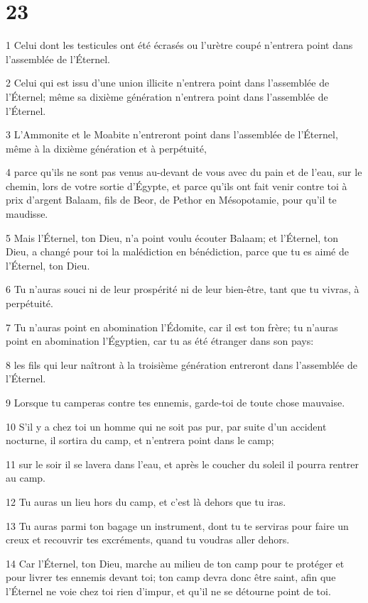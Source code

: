 \chapter{23}

\par 1 Celui dont les testicules ont été écrasés ou l'urètre coupé n'entrera point dans l'assemblée de l'Éternel.
\par 2 Celui qui est issu d'une union illicite n'entrera point dans l'assemblée de l'Éternel; même sa dixième génération n'entrera point dans l'assemblée de l'Éternel.
\par 3 L'Ammonite et le Moabite n'entreront point dans l'assemblée de l'Éternel, même à la dixième génération et à perpétuité,
\par 4 parce qu'ils ne sont pas venus au-devant de vous avec du pain et de l'eau, sur le chemin, lors de votre sortie d'Égypte, et parce qu'ils ont fait venir contre toi à prix d'argent Balaam, fils de Beor, de Pethor en Mésopotamie, pour qu'il te maudisse.
\par 5 Mais l'Éternel, ton Dieu, n'a point voulu écouter Balaam; et l'Éternel, ton Dieu, a changé pour toi la malédiction en bénédiction, parce que tu es aimé de l'Éternel, ton Dieu.
\par 6 Tu n'auras souci ni de leur prospérité ni de leur bien-être, tant que tu vivras, à perpétuité.
\par 7 Tu n'auras point en abomination l'Édomite, car il est ton frère; tu n'auras point en abomination l'Égyptien, car tu as été étranger dans son pays:
\par 8 les fils qui leur naîtront à la troisième génération entreront dans l'assemblée de l'Éternel.
\par 9 Lorsque tu camperas contre tes ennemis, garde-toi de toute chose mauvaise.
\par 10 S'il y a chez toi un homme qui ne soit pas pur, par suite d'un accident nocturne, il sortira du camp, et n'entrera point dans le camp;
\par 11 sur le soir il se lavera dans l'eau, et après le coucher du soleil il pourra rentrer au camp.
\par 12 Tu auras un lieu hors du camp, et c'est là dehors que tu iras.
\par 13 Tu auras parmi ton bagage un instrument, dont tu te serviras pour faire un creux et recouvrir tes excréments, quand tu voudras aller dehors.
\par 14 Car l'Éternel, ton Dieu, marche au milieu de ton camp pour te protéger et pour livrer tes ennemis devant toi; ton camp devra donc être saint, afin que l'Éternel ne voie chez toi rien d'impur, et qu'il ne se détourne point de toi.
